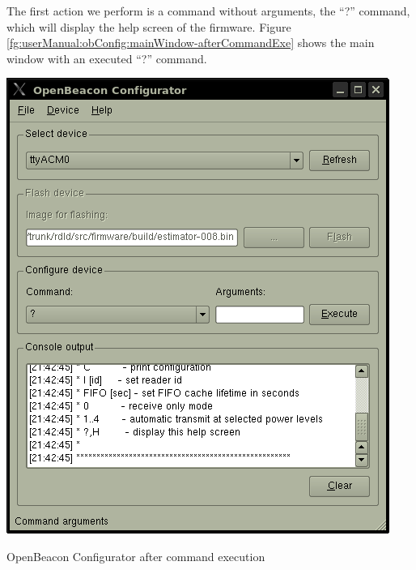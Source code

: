    The first action we perform is a command without arguments, the ``?'' command, which will display the help screen of the firmware. Figure \ref{fg:userManual:obConfig:mainWindow-afterCommandExe} shows the main window with an executed ``?'' command.
   \begin{staticFigure}
    \begin{center}
     \includegraphics{images/UserManual/obConfig/mainWindow-afterCommandExe.png}
     \caption{OpenBeacon Configurator after command execution}
     \label{fg:userManual:obConfig:mainWindow-afterCommandExe}
    \end{center}
   \end{staticFigure}

